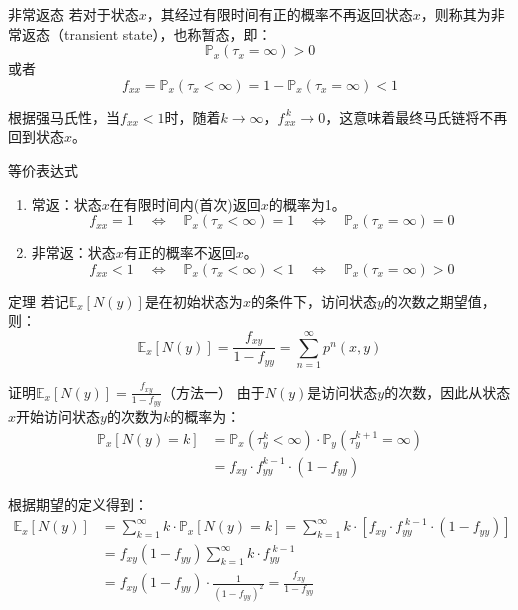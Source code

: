 \documentclass[t]{beamer}
\renewcommand{\Pr}{\mathbb{P}}
\newcommand{\E}{\mathbb{E}}
\begin{document}
\begin{frame}{非常返态}
    若对于状态$x$，其经过有限时间有正的概率不再返回状态$x$，则称其为非常返态（transient state），也称暂态，即：
    \[\Pr_x(\tau_x=\infty)>0\]
    或者\[f_{xx}=\Pr_x(\tau_x<\infty)=1-\Pr_x(\tau_x=\infty)<1 \]

    根据强马氏性，当$f_{xx}<1$时，随着$k\to\infty$，$f_{xx}^{\, k}\to 0$，这意味着最终马氏链将不再回到状态$x$。
\end{frame}

\begin{frame}{等价表达式}
    \begin{enumerate}
        \item 常返：状态$x$在有限时间内(首次)返回$x$的概率为1。
        \[f_{xx}=1  \quad\Longleftrightarrow\quad  \Pr_{x}(\tau_x<\infty)=1  \quad\Longleftrightarrow\quad   \Pr_{x}(\tau_x=\infty)=0\]
        \item 非常返：状态$x$有正的概率不返回$x$。
        \[f_{xx}<1  \quad\Longleftrightarrow\quad  \Pr_{x}(\tau_x<\infty)<1  \quad\Longleftrightarrow\quad   \Pr_{x}(\tau_x=\infty)>0\]  
        \end{enumerate}
        
\end{frame}

\begin{frame}{定理}
    若记$\E_x[N(y)]$是在初始状态为$x$的条件下，访问状态$y$的次数之期望值，则：
    \[\E_x[N(y)]=\frac{f_{xy}}{1-f_{yy}}=\sum^{\infty}_{n=1} p^n(x,y) \]
\end{frame}



\begin{frame}{证明$\E_x[N(y)]=\frac{f_{xy}}{1-f_{yy}}$（方法一）}
    由于$N(y)$是访问状态$y$的次数，因此从状态$x$开始访问状态$y$的次数为$k$的概率为：
    \[\begin{split}
    \Pr_x[N(y)=k]&=\Pr_{x}(\tau_y^k <\infty)\cdot \Pr_{y}(\tau_y^{k+1} =\infty) \\
    &=f_{xy}\cdot f_{yy}^{k-1} \cdot (1-f_{yy})
    \end{split}
    \]

    根据期望的定义得到：
\[\begin{split}
\E_x[N(y)]&= \sum_{k=1}^{\infty} k\cdot \Pr_x[N(y)=k]= \sum_{k=1}^{\infty} k\cdot \left[f_{xy}\cdot f_{yy}^{\;k-1} \cdot (1-f_{yy})\right]\\
&= f_{xy}(1-f_{yy}) \sum_{k=1}^{\infty} k\cdot f_{yy}^{\;k-1}  \\
&= f_{xy}(1-f_{yy}) \cdot \frac{1}{(1-f_{yy})^2}=\frac{f_{xy}}{1-f_{yy}}
\end{split} \]
\end{frame}
\end{document}
